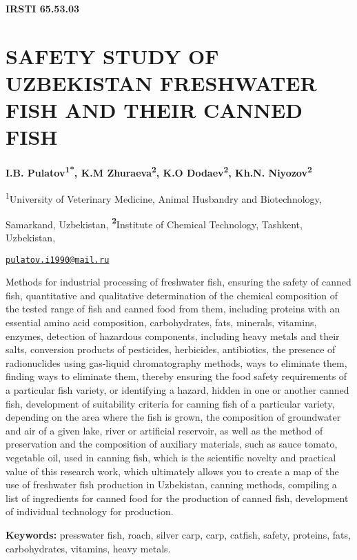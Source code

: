 \clearpage
{\bfseries IRSTI 65.53.03}

\section{SAFETY STUDY OF UZBEKISTAN FRESHWATER FISH AND THEIR CANNED FISH}

\begin{center}
{\bfseries I.B. Pulatov\textsuperscript{1*}, K.M
Zhuraeva\textsuperscript{2}, K.O Dodaev\textsuperscript{2}, Kh.N.
Niyozov\textsuperscript{2}}

\textsuperscript{1}University of Veterinary Medicine, Animal Husbandry
and Biotechnology,

Samarkand, Uzbekistan, {\bfseries \textsuperscript{2}}Institute of Chemical
Technology, Tashkent, Uzbekistan,

\href{mailto:pulatov.i1990@mail.ru}{\nolinkurl{pulatov.i1990@mail.ru}}
\end{center}

Methods for industrial processing of freshwater fish, ensuring the
safety of canned fish, quantitative and qualitative determination of the
chemical composition of the tested range of fish and canned food from
them, including proteins with an essential amino acid composition,
carbohydrates, fats, minerals, vitamins, enzymes, detection of hazardous
components, including heavy metals and their salts, conversion products
of pesticides, herbicides, antibiotics, the presence of radionuclides
using gas-liquid chromatography methods, ways to eliminate them, finding
ways to eliminate them, thereby ensuring the food safety requirements of
a particular fish variety, or identifying a hazard, hidden in one or
another canned fish, development of suitability criteria for canning
fish of a particular variety, depending on the area where the fish is
grown, the composition of groundwater and air of a given lake, river or
artificial reservoir, as well as the method of preservation and the
composition of auxiliary materials, such as sauce tomato, vegetable oil,
used in canning fish, which is the scientific novelty and practical
value of this research work, which ultimately allows you to create a map
of the use of freshwater fish production in Uzbekistan, canning methods,
compiling a list of ingredients for canned food for the production of
canned fish, development of individual technology for production.

{\bfseries Keywords:} presswater fish, roach, silver carp, carp, catfish,
safety, proteins, fats, carbohydrates, vitamins, heavy metals.

